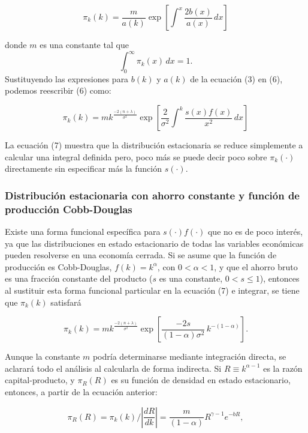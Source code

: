 \documentclass[a4paper,12pt]{article}
\begin{document}
\begin{equation}
	\pi_k(k) = \frac{m}{a(k)} \exp \left[ \int^x \frac{2b(x)}{a(x)}\,dx \right]
\end{equation}

donde $m$ es una constante tal que
\[
\int_0^\infty \pi_k(x)\,dx = 1.
\]
Sustituyendo las expresiones para $b(k)$ y $a(k)$ de la ecuación (3) en (6), podemos reescribir (6) como:

\begin{equation}
\pi_k(k) = mk^{\frac{-2(n + \lambda)}{\sigma^2}} \exp\left[ \frac{2}{\sigma^2} \int^k \frac{s(x)f(x)}{x^2} \, dx \right]
\end{equation}

La ecuación (7) muestra que la distribución estacionaria se reduce simplemente a calcular una integral definida pero, poco más se puede decir poco sobre $\pi_k(\cdot)$ directamente sin especificar más la función $s(\cdot)$.

	
\subsubsection{Distribución estacionaria con ahorro constante y función de producción Cobb-Douglas}

Existe una forma funcional específica para $s(\cdot)f(\cdot)$ que no es de poco interés, ya que las distribuciones en estado estacionario de todas las variables económicas pueden resolverse en una economía cerrada. Si se asume que la función de producción es Cobb-Douglas, $f(k) = k^\alpha$, con $0 < \alpha < 1$, y que el ahorro bruto es una fracción constante del producto ($s$ es una constante, $0 < s \leq 1$), entonces al sustituir esta forma funcional particular en la ecuación (7) e integrar, se tiene que $\pi_k(k)$ satisfará

\begin{equation}
	\pi_k(k) = mk^{\frac{-2(n+\lambda)}{\sigma^2}} \exp\left[ \frac{-2s}{(1-\alpha)\sigma^2} \, k^{-(1-\alpha)} \right].
\end{equation}

Aunque la constante $m$ podría determinarse mediante integración directa, se aclarará todo el análisis al calcularla de forma indirecta. Si $R \equiv k^{\alpha - 1}$ es la razón capital-producto, y $\pi_R(R)$ es su función de densidad en estado estacionario, entonces, a partir de la ecuación anterior:

\begin{equation}
	\pi_R(R) = \pi_k(k) / \left| \frac{dR}{dk} \right|
	= \frac{m}{(1-\alpha)} R^{\gamma-1} e^{-bR},
\end{equation}
\end{document}
